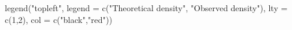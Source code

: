 \begin{Schunk}
\begin{Sinput}
 legend("topleft", legend = c("Theoretical density", "Observed density"), lty = c(1,2), col = c("black","red"))
\end{Sinput}
\end{Schunk}
